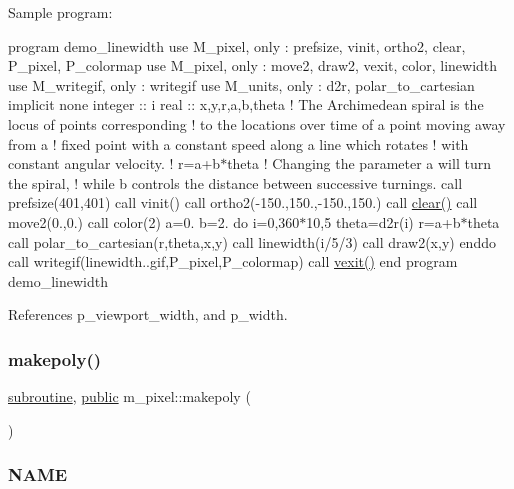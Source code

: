 Sample program\+:

program demo\+\_\+linewidth use M\+\_\+pixel, only \+: prefsize, vinit, ortho2, clear, P\+\_\+pixel, P\+\_\+colormap use M\+\_\+pixel, only \+: move2, draw2, vexit, color, linewidth use M\+\_\+writegif, only \+: writegif use M\+\_\+units, only \+: d2r, polar\+\_\+to\+\_\+cartesian implicit none integer \+:\+: i real \+:\+: x,y,r,a,b,theta ! The Archimedean spiral is the locus of points corresponding ! to the locations over time of a point moving away from a ! fixed point with a constant speed along a line which rotates ! with constant angular velocity. ! r=a+b$\ast$theta ! Changing the parameter a will turn the spiral, ! while b controls the distance between successive turnings. call prefsize(401,401) call vinit(\textquotesingle{}\textquotesingle{}) call ortho2(-\/150.,150.,-\/150.,150.) call \hyperlink{namespacem__pixel_af3b81a21a0b2f6b5eddd09c031bd6173}{clear()} call move2(0.,0.) call color(2) a=0. b=2. do i=0,360$\ast$10,5 theta=d2r(i) r=a+b$\ast$theta call polar\+\_\+to\+\_\+cartesian(r,theta,x,y) call linewidth(i/5/3) call draw2(x,y) enddo call writegif(\textquotesingle{}linewidth..\+gif\textquotesingle{},P\+\_\+pixel,P\+\_\+colormap) call \hyperlink{namespacem__pixel_a19ad6b65752322b0029a62cc0ebec3e8}{vexit()} end program demo\+\_\+linewidth 

References p\+\_\+viewport\+\_\+width, and p\+\_\+width.

\mbox{\label{namespacem__pixel_ab7128437f95b40004bf73fc6e3f597f8}} 
\subsubsection{\texorpdfstring{makepoly()}{makepoly()}}
{\footnotesize\ttfamily \hyperlink{M__stopwatch_83_8txt_acfbcff50169d691ff02d4a123ed70482}{subroutine}, \hyperlink{M__stopwatch_83_8txt_a2f74811300c361e53b430611a7d1769f}{public} m\+\_\+pixel\+::makepoly (\begin{DoxyParamCaption}{ }\end{DoxyParamCaption})}



\subsubsection*{N\+A\+ME}

